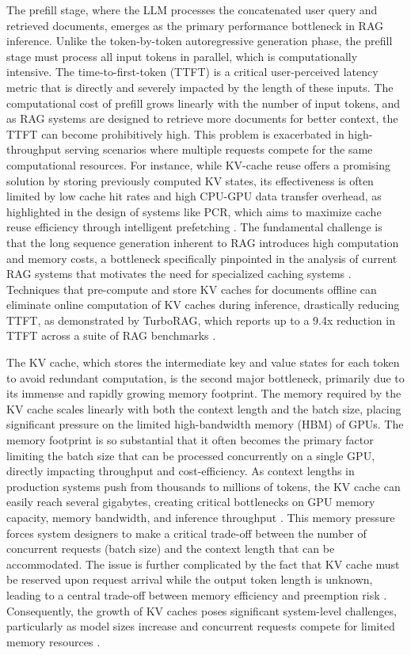 \documentclass[11pt]{article}
\begin{document}
The prefill stage, where the LLM processes the concatenated user query and retrieved documents, emerges as the primary performance bottleneck in RAG inference. Unlike the token-by-token autoregressive generation phase, the prefill stage must process all input tokens in parallel, which is computationally intensive. The time-to-first-token (TTFT) is a critical user-perceived latency metric that is directly and severely impacted by the length of these inputs. The computational cost of prefill grows linearly with the number of input tokens, and as RAG systems are designed to retrieve more documents for better context, the TTFT can become prohibitively high. This problem is exacerbated in high-throughput serving scenarios where multiple requests compete for the same computational resources. For instance, while KV-cache reuse offers a promising solution by storing previously computed KV states, its effectiveness is often limited by low cache hit rates and high CPU-GPU data transfer overhead, as highlighted in the design of systems like PCR, which aims to maximize cache reuse efficiency through intelligent prefetching \cite{ref509}. The fundamental challenge is that the long sequence generation inherent to RAG introduces high computation and memory costs, a bottleneck specifically pinpointed in the analysis of current RAG systems that motivates the need for specialized caching systems \cite{ref510}. Techniques that pre-compute and store KV caches for documents offline can eliminate online computation of KV caches during inference, drastically reducing TTFT, as demonstrated by TurboRAG, which reports up to a 9.4x reduction in TTFT across a suite of RAG benchmarks \cite{ref511}.

The KV cache, which stores the intermediate key and value states for each token to avoid redundant computation, is the second major bottleneck, primarily due to its immense and rapidly growing memory footprint. The memory required by the KV cache scales linearly with both the context length and the batch size, placing significant pressure on the limited high-bandwidth memory (HBM) of GPUs. The memory footprint is so substantial that it often becomes the primary factor limiting the batch size that can be processed concurrently on a single GPU, directly impacting throughput and cost-efficiency. As context lengths in production systems push from thousands to millions of tokens, the KV cache can easily reach several gigabytes, creating critical bottlenecks on GPU memory capacity, memory bandwidth, and inference throughput \cite{ref512}. This memory pressure forces system designers to make a critical trade-off between the number of concurrent requests (batch size) and the context length that can be accommodated. The issue is further complicated by the fact that KV cache must be reserved upon request arrival while the output token length is unknown, leading to a central trade-off between memory efficiency and preemption risk \cite{ref513}. Consequently, the growth of KV caches poses significant system-level challenges, particularly as model sizes increase and concurrent requests compete for limited memory resources \cite{ref514}.
\end{document}
